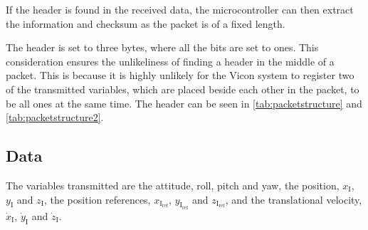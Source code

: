 If the header is found in the received data, the microcontroller can then extract the information and checksum as the packet is of a fixed length. 

The header is set to three bytes, where all the bits are set to ones. This consideration ensures the unlikeliness of finding a header in the middle of a packet. This is because it is highly unlikely for the Vicon system to register two of the transmitted variables, which are placed beside each other in the packet, to be all ones at the same time. The header can be seen in \autoref{tab:packetstructure} and \autoref{tab:packetstructure2}.

\subsection{Data}
The variables transmitted are the attitude, roll, pitch and yaw, the position, $x_{\mathrm{I}}$, $y_{\mathrm{I}}$ and $z_{\mathrm{I}}$, the position references, $x_{\mathrm{I_{ref}}}$, $y_{\mathrm{I_{ref}}}$ and $z_{\mathrm{I_{ref}}}$, and the translational velocity, $\dot{x}_{\mathrm{I}}$, $\dot{y}_{\mathrm{I}}$ and $\dot{z}_{\mathrm{I}}$. 
